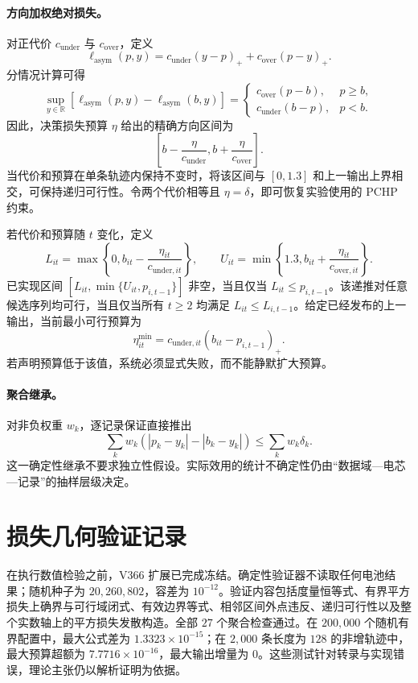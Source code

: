 \documentclass[UTF8,11pt]{ctexart}
\begin{document}
\paragraph{方向加权绝对损失。}
对正代价 \(c_{\mathrm{under}}\) 与 \(c_{\mathrm{over}}\)，定义
\[
 \ell_{\mathrm{asym}}(p,y)
 =c_{\mathrm{under}}(y-p)_+
 +c_{\mathrm{over}}(p-y)_+.
\]
分情况计算可得
\begin{equation}
 \sup_{y\in\mathbb R}
 [\ell_{\mathrm{asym}}(p,y)-\ell_{\mathrm{asym}}(b,y)]
 =
 \begin{cases}
 c_{\mathrm{over}}(p-b), & p\geq b,\\
 c_{\mathrm{under}}(b-p), & p<b.
 \end{cases}
 \label{eq:supp_asymmetric_identity_zh}
\end{equation}
因此，决策损失预算 \(\eta\) 给出的精确方向区间为
\[
 \left[b-\frac{\eta}{c_{\mathrm{under}}},
 b+\frac{\eta}{c_{\mathrm{over}}}\right].
\]
当代价和预算在单条轨迹内保持不变时，将该区间与 \([0,1.3]\) 和上一输出上界相交，可保持递归可行性。令两个代价相等且 \(\eta=\delta\)，即可恢复实验使用的 PCHP 约束。

若代价和预算随 \(t\) 变化，定义
\[
 L_{it}=\max\!\left\{0,b_{it}-\frac{\eta_{it}}{c_{\mathrm{under},it}}\right\},
 \qquad
 U_{it}=\min\!\left\{1.3,b_{it}+\frac{\eta_{it}}{c_{\mathrm{over},it}}\right\}.
\]
已实现区间 \([L_{it},\min\{U_{it},p_{i,t-1}\}]\) 非空，当且仅当 \(L_{it}\leq p_{i,t-1}\)。该递推对任意候选序列均可行，当且仅当所有 \(t\geq2\) 均满足 \(L_{it}\leq L_{i,t-1}\)。给定已经发布的上一输出，当前最小可行预算为
\begin{equation}
 \eta^{\min}_{it}
 =c_{\mathrm{under},it}(b_{it}-p_{i,t-1})_+.
 \label{eq:supp_minimum_viable_budget_zh}
\end{equation}
若声明预算低于该值，系统必须显式失败，而不能静默扩大预算。

\paragraph{聚合继承。}
对非负权重 \(w_k\)，逐记录保证直接推出
\[
 \sum_k w_k(|p_k-y_k|-|b_k-y_k|)
 \leq\sum_k w_k\delta_k.
\]
这一确定性继承不要求独立性假设。实际效用的统计不确定性仍由“数据域—电芯—记录”的抽样层级决定。

\section{损失几何验证记录}

在执行数值检验之前，V366 扩展已完成冻结。确定性验证器不读取任何电池结果；随机种子为 $20{,}260{,}802$，容差为 $10^{-12}$。验证内容包括度量恒等式、有界平方损失上确界与可行域闭式、有效边界等式、相邻区间外点违反、递归可行性以及整个实数轴上的平方损失发散构造。全部 $27$ 个聚合检查通过。在 $200{,}000$ 个随机有界配置中，最大公式差为 $1.3323\times10^{-15}$；在 $2{,}000$ 条长度为 $128$ 的非增轨迹中，最大预算超额为 $7.7716\times10^{-16}$，最大输出增量为 $0$。这些测试针对转录与实现错误，理论主张仍以解析证明为依据。
\end{document}
